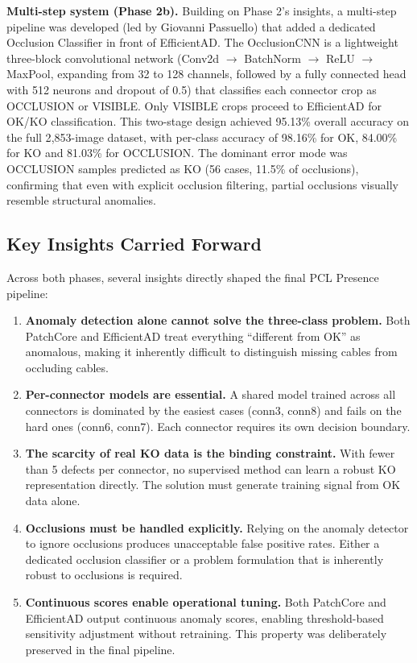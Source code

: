 \documentclass[11pt,a4paper,draft]{article}
\begin{document}
\textbf{Multi-step system (Phase 2b).} Building on Phase 2's insights, a multi-step pipeline was developed (led by Giovanni Passuello) that added a dedicated Occlusion Classifier in front of EfficientAD. The OcclusionCNN is a lightweight three-block convolutional network (Conv2d $\to$ BatchNorm $\to$ ReLU $\to$ MaxPool, expanding from 32 to 128 channels, followed by a fully connected head with 512 neurons and dropout of 0.5) that classifies each connector crop as OCCLUSION or VISIBLE. Only VISIBLE crops proceed to EfficientAD for OK/KO classification. This two-stage design achieved 95.13\% overall accuracy on the full 2{,}853-image dataset, with per-class accuracy of 98.16\% for OK, 84.00\% for KO and 81.03\% for OCCLUSION. The dominant error mode was OCCLUSION samples predicted as KO (56 cases, 11.5\% of occlusions), confirming that even with explicit occlusion filtering, partial occlusions visually resemble structural anomalies.

\subsection{Key Insights Carried Forward}

Across both phases, several insights directly shaped the final PCL Presence pipeline:

\begin{enumerate}[nosep]
    \item \textbf{Anomaly detection alone cannot solve the three-class problem.} Both PatchCore and EfficientAD treat everything ``different from OK'' as anomalous, making it inherently difficult to distinguish missing cables from occluding cables.
    \item \textbf{Per-connector models are essential.} A shared model trained across all connectors is dominated by the easiest cases (conn3, conn8) and fails on the hard ones (conn6, conn7). Each connector requires its own decision boundary.
    \item \textbf{The scarcity of real KO data is the binding constraint.} With fewer than 5 defects per connector, no supervised method can learn a robust KO representation directly. The solution must generate training signal from OK data alone.
    \item \textbf{Occlusions must be handled explicitly.} Relying on the anomaly detector to ignore occlusions produces unacceptable false positive rates. Either a dedicated occlusion classifier or a problem formulation that is inherently robust to occlusions is required.
    \item \textbf{Continuous scores enable operational tuning.} Both PatchCore and EfficientAD output continuous anomaly scores, enabling threshold-based sensitivity adjustment without retraining. This property was deliberately preserved in the final pipeline.
\end{enumerate}
\end{document}
